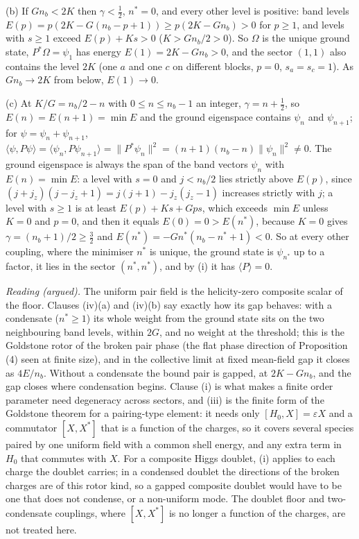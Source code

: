 (b) If $Gn_{b} < 2K$ then $\gamma < \tfrac12$, $n^{*} = 0$, and every other level is positive: band levels $E(p) = p(2K - G(n_{b} - p + 1)) \ge p(2K - Gn_{b}) > 0$ for $p \ge 1$, and levels with $s \ge 1$ exceed $E(p) + Ks > 0$ ($K > Gn_{b}/2 > 0$). So $\Omega$ is the unique ground state, $P^{*}\Omega = \psi_{1}$ has energy $E(1) = 2K - Gn_{b} > 0$, and the sector $(1, 1)$ also contains the level $2K$ (one $a$ and one $c$ on different blocks, $p = 0$, $s_{a} = s_{c} = 1$). As $Gn_{b} \to 2K$ from below, $E(1) \to 0$.

(c) At $K/G = n_{b}/2 - n$ with $0 \le n \le n_{b} - 1$ an integer, $\gamma = n + \tfrac12$, so $E(n) = E(n + 1) = \min E$ and the ground eigenspace contains $\psi_{n}$ and $\psi_{n+1}$; for $\psi = \psi_{n} + \psi_{n+1}$, $\langle\psi, P\psi\rangle = \langle\psi_{n}, P\psi_{n+1}\rangle = \|P^{*}\psi_{n}\|^{2} = (n + 1)(n_{b} - n)\|\psi_{n}\|^{2} \ne 0$. The ground eigenspace is always the span of the band vectors $\psi_{n}$ with $E(n) = \min E$: a level with $s = 0$ and $j < n_{b}/2$ lies strictly above $E(p)$, since $(j + j_{z})(j - j_{z} + 1) = j(j + 1) - j_{z}(j_{z} - 1)$ increases strictly with $j$; a level with $s \ge 1$ is at least $E(p) + Ks + Gps$, which exceeds $\min E$ unless $K = 0$ and $p = 0$, and then it equals $E(0) = 0 > E(n^{*})$, because $K = 0$ gives $\gamma = (n_{b} + 1)/2 \ge \tfrac32$ and $E(n^{*}) = -Gn^{*}(n_{b} - n^{*} + 1) < 0$. So at every other coupling, where the minimiser $n^{*}$ is unique, the ground state is $\psi_{n^{*}}$ up to a factor, it lies in the sector $(n^{*}, n^{*})$, and by (i) it has $\langle P\rangle = 0$.

\emph{Reading (argued).} The uniform pair field is the helicity-zero composite scalar of the floor. Clauses (iv)(a) and (iv)(b) say exactly how its gap behaves: with a condensate ($n^{*} \ge 1$) its whole weight from the ground state sits on the two neighbouring band levels, within $2G$, and no weight at the threshold; this is the Goldstone rotor of the broken pair phase (the flat phase direction of Proposition (4) seen at finite size), and in the collective limit at fixed mean-field gap it closes as $4E/n_{b}$. Without a condensate the bound pair is gapped, at $2K - Gn_{b}$, and the gap closes where condensation begins. Clause (i) is what makes a finite order parameter need degeneracy across sectors, and (iii) is the finite form of the Goldstone theorem for a pairing-type element: it needs only $[H_{0}, X] = \varepsilon X$ and a commutator $[X, X^{*}]$ that is a function of the charges, so it covers several species paired by one uniform field with a common shell energy, and any extra term in $H_{0}$ that commutes with $X$. For a composite Higgs doublet, (i) applies to each charge the doublet carries; in a condensed doublet the directions of the broken charges are of this rotor kind, so a gapped composite doublet would have to be one that does not condense, or a non-uniform mode. The doublet floor and two-condensate couplings, where $[X, X^{*}]$ is no longer a function of the charges, are not treated here.
